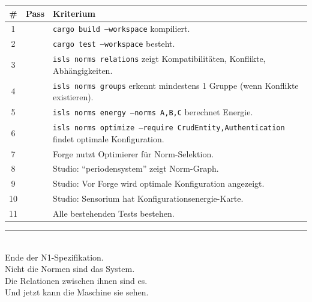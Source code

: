 \documentclass[11pt,a4paper]{article}
\begin{document}
\begin{longtable}{clp{9cm}}
\toprule
\# & Pass & Kriterium \\
\midrule
1 & & \texttt{cargo build --workspace} kompiliert. \\
2 & & \texttt{cargo test --workspace} besteht. \\
3 & & \texttt{isls norms relations} zeigt Kompatibilit\"aten, Konflikte, Abh\"angigkeiten. \\
4 & & \texttt{isls norms groups} erkennt mindestens 1 Gruppe (wenn Konflikte existieren). \\
5 & & \texttt{isls norms energy --norms A,B,C} berechnet Energie. \\
6 & & \texttt{isls norms optimize --require CrudEntity,Authentication} findet optimale Konfiguration. \\
7 & & Forge nutzt Optimierer f\"ur Norm-Selektion. \\
8 & & Studio: ``periodensystem'' zeigt Norm-Graph. \\
9 & & Studio: Vor Forge wird optimale Konfiguration angezeigt. \\
10 & & Studio: Sensorium hat Konfigurationsenergie-Karte. \\
11 & & Alle bestehenden Tests bestehen. \\
\bottomrule
\end{longtable}

\vfill
\begin{center}
\color{isls-gray}\rule{0.5\textwidth}{0.4pt}\\[0.5em]
{\small Ende der N1-Spezifikation.\\[0.3em]
Nicht die Normen sind das System.\\Die Relationen zwischen ihnen sind es.\\Und jetzt kann die Maschine sie sehen.}
\end{center}
\end{document}
